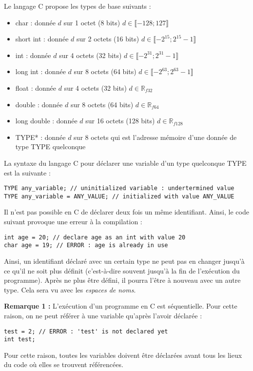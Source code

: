\documentclass[../../../main.tex]{subfiles}
\begin{document}
Le langage C propose les types de base suivants :
\begin{itemize}
	\item \textsf{char} : donnée $d$ sur 1 octet (8 bits) $d\in{\llbracket-128; 127\rrbracket}$
	\item \textsf{short int} : donnée $d$ sur 2 octets (16 bits) $d\in{\llbracket-2^{15}; 2^{15}-1\rrbracket}$
	\item \textsf{int} : donnée $d$ sur 4 octets (32 bits) $d\in{\llbracket-2^{31}; 2^{31}-1\rrbracket}$
	\item \textsf{long int} : donnée $d$ sur 8 octets (64 bits) $d\in{\llbracket-2^{63}; 2^{63}-1\rrbracket}$
	\item \textsf{float} : donnée $d$ sur 4 octets (32 bits) $d\in{\mathbb{R}_{f32}}$
	\item \textsf{double} : donnée $d$ sur 8 octets (64 bits) $d\in{\mathbb{R}_{f64}}$
	\item \textsf{long double} : donnée $d$ sur 16 octets (128 bits) $d\in{\mathbb{R}_{f128}}$
	\item \textsf{TYPE*} : donnée $d$ sur 8 octets qui est l'adresse mémoire d'une donnée de type \textsf{TYPE} quelconque
\end{itemize}
La syntaxe du langage C pour déclarer une variable d'un type quelconque \textsf{TYPE} est la suivante :
\begin{verbatim}
TYPE any_variable; // uninitialized variable : undertermined value
TYPE any_variable = ANY_VALUE; // initialized with value ANY_VALUE
\end{verbatim}
Il n'est pas possible en C de déclarer deux fois un même identifiant. Ainsi, le code suivant provoque une erreur à la compilation :
\begin{verbatim}
int age = 20; // declare age as an int with value 20
char age = 19; // ERROR : age is already in use
\end{verbatim}
Ainsi, un identifiant déclaré avec un certain type ne peut pas en changer jusqu'à ce qu'il ne soit plus définit (c'est-à-dire souvent jusqu'à la fin de l'exécution du programme). Après ne plus être défini, il pourra l'être à nouveau avec un autre type. Cela sera vu avec les \textit{espaces de noms}.
 
\textbf{Remarque 1 :} L'exécution d'un programme en C est séquentielle. Pour cette raison, on ne peut référer à une variable qu'après l'avoir déclarée :
\begin{verbatim}
test = 2; // ERROR : 'test' is not declared yet
int test;
\end{verbatim}
Pour cette raison, toutes les variables doivent être déclarées avant tous les lieux du code où elles se trouvent référencées.
 
\end{document}
